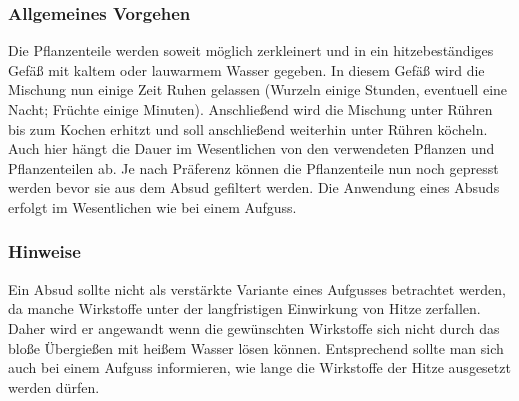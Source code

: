\subsubsection{Allgemeines Vorgehen}
Die Pflanzenteile werden soweit möglich zerkleinert und in ein hitzebeständiges Gefäß mit kaltem oder lauwarmem Wasser gegeben. In diesem Gefäß wird die Mischung nun einige Zeit Ruhen gelassen (Wurzeln einige Stunden, eventuell eine Nacht; Früchte einige Minuten). Anschließend wird die Mischung unter Rühren bis zum Kochen erhitzt und soll anschließend weiterhin unter Rühren köcheln. Auch hier hängt die Dauer im Wesentlichen von den verwendeten Pflanzen und Pflanzenteilen ab. Je nach Präferenz können die Pflanzenteile nun noch gepresst werden bevor sie aus dem Absud gefiltert werden.
Die Anwendung eines Absuds erfolgt im Wesentlichen wie bei einem Aufguss.
\subsubsection{Hinweise}
Ein Absud sollte nicht als verstärkte Variante eines Aufgusses betrachtet werden, da manche Wirkstoffe unter der langfristigen Einwirkung von Hitze zerfallen. Daher wird er angewandt wenn die gewünschten Wirkstoffe sich nicht durch das bloße Übergießen mit heißem Wasser lösen können. Entsprechend sollte man sich auch bei einem Aufguss informieren, wie lange die Wirkstoffe der Hitze ausgesetzt werden dürfen.

						


						
						
																	
